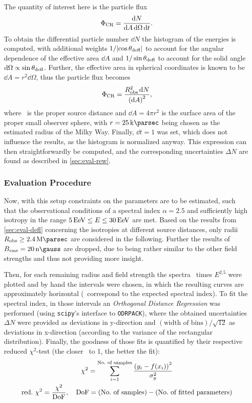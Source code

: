 The quantity of interest here is the particle flux
\begin{equation*}
    \Phi_{\mathrm{CR}}=\frac{\dd{N}}{\dd{A}\dd{\Omega}\dd{t}}.
\end{equation*}
To obtain the differential particle number $\dd{N}$ the histogram of the
energies is computed, with additional weights $1/\abs{\cos\theta_{\mathrm{defl}}}$ to account
for the angular dependence of the effective area $\dd{A}$ and $1/\sin\theta_{\mathrm{defl}}$ to
account for the solid angle $\dd{\Omega}\propto\sin\theta_{\mathrm{defl}}$.
Further, the effective area in spherical coordinates is known to be
$\dd{A}=r^2\dd{\Omega}$, thus the particle flux becomes
\begin{equation*}
    \Phi_{\mathrm{CR}}=\frac{R_{\mathrm{obs}}^2\dd{N}}{\left(\dd{A}\right)^2},
\end{equation*}
where \Robserver~is the proper source distance and
$\dd{A}=4\pi{r}^2$ is the surface area of the proper small observer
sphere, with $r=\SI{25}{\kilo\parsec}$ being chosen as the
estimated radius of the Milky Way. Finally, $\dd{t}=1$ was set, which does not
influence the results, as the histogram is normalized anyway.
This expression can then straightforwardly be computed, and the corresponding
uncertainties $\Delta{N}$ are found as described in \cref{sec:eval-rew}.

\subsubsection*{Evaluation Procedure}
Now, with this setup constraints on the parameters are to be estimated, such
that the observational conditions of a spectral index $\alpha=2.5$ and
sufficiently high isotropy in the range $\inrange{E}{5}{30}{\exa\eV}$ are met.
Based on the results from \cref{sec:eval-defl} concerning the isotropies at
different source distances, only radii $\Robserver\ge\SI{2.4}{\mega\parsec}$
are considered in the following. Further the results of
$\Brms=\SI{20}{\nano\gauss}$ are dropped, due to being rather similar to the
other field strengths and thus not providing more insight.

Then, for each remaining radius and field strength the spectra \CRFlux~times
$E^{2.5}$ were plotted and by hand the intervals were chosen, in which the
resulting curves are approximately horizontal (\ie~correspond to the expected
spectral index). To fit the spectral index, in those intervals an
\emph{Orthogonal Distance Regression} was performed (using \texttt{scipy}'s
interface to \texttt{ODRPACK}), where the obtained uncertainties $\Delta{N}$
were provided as deviations in y-direction and $(\text{width of
bins})/\sqrt{12}$ as deviations in x-direction (according to the variance of
the rectangular distribution). Finally, the goodness of those fits is
quantified by their respective reduced $\chi^2$-test (the closer \redchisq~to
1, the better the fit):
\begin{gather*}
    \chi^2=\sum_{i=1}^{\text{No.~of samples}}
    \frac{\left(y_i-f(x_i)\right)^2}{\sigma_y^2} \\
    \redchisq=\frac{\chi^2}{\text{DoF}}
    \qc\text{DoF}=(\text{No.~of samples})-(\text{No.~of fitted parameters})
\end{gather*}

